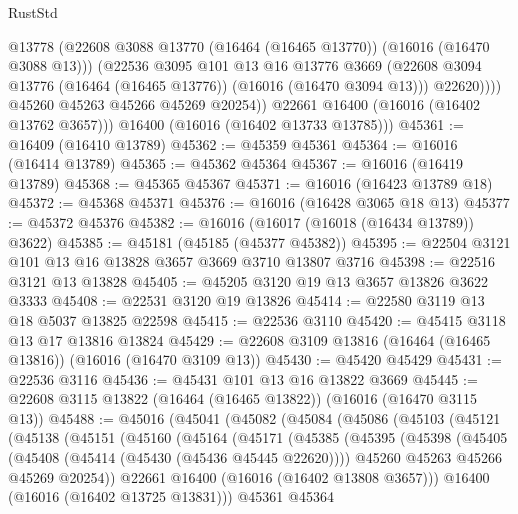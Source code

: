 \begin{lexlean}{RustStd}
\begin{coremodule}
                  @13778
                  (@22608 @3088 @13770 (@16464 (@16465 @13770)) (@16016 (@16470 @3088 @13)))
                  (@22536
                    @3095
                    @101
                    @13
                    @16
                    @13776
                    @3669
                    (@22608 @3094 @13776 (@16464 (@16465 @13776)) (@16016 (@16470 @3094 @13)))
                    @22620))))
            @45260
            @45263
            @45266
            @45269
            @20254))
        @22661
        @16400
        (@16016 (@16402 @13762 @3657)))
      @16400
      (@16016 (@16402 @13733 @13785)))
@45361 := @16409 (@16410 @13789)
@45362 := @45359 @45361
@45364 := @16016 (@16414 @13789)
@45365 := @45362 @45364
@45367 := @16016 (@16419 @13789)
@45368 := @45365 @45367
@45371 := @16016 (@16423 @13789 @18)
@45372 := @45368 @45371
@45376 := @16016 (@16428 @3065 @18 @13)
@45377 := @45372 @45376
@45382 := @16016 (@16017 (@16018 (@16434 @13789)) @3622)
@45385 := @45181 (@45185 (@45377 @45382))
@45395 := @22504 @3121 @101 @13 @16 @13828 @3657 @3669 @3710 @13807 @3716
@45398 := @22516 @3121 @13 @13828
@45405 := @45205 @3120 @19 @13 @3657 @13826 @3622 @3333
@45408 := @22531 @3120 @19 @13826
@45414 := @22580 @3119 @13 @18 @5037 @13825 @22598
@45415 := @22536 @3110
@45420 := @45415 @3118 @13 @17 @13816 @13824
@45429 := @22608 @3109 @13816 (@16464 (@16465 @13816)) (@16016 (@16470 @3109 @13))
@45430 := @45420 @45429
@45431 := @22536 @3116
@45436 := @45431 @101 @13 @16 @13822 @3669
@45445 := @22608 @3115 @13822 (@16464 (@16465 @13822)) (@16016 (@16470 @3115 @13))
@45488 := @45016
    (@45041
      (@45082
        (@45084
          (@45086
            (@45103
              (@45121
                (@45138
                  (@45151
                    (@45160
                      (@45164
                        (@45171
                          (@45385
                            (@45395
                              (@45398
                                (@45405
                                  (@45408 (@45414 (@45430 (@45436 @45445 @22620))))
                                  @45260
                                  @45263
                                  @45266
                                  @45269
                                  @20254))
                              @22661
                              @16400
                              (@16016 (@16402 @13808 @3657)))
                            @16400
                            (@16016 (@16402 @13725 @13831)))
                          @45361
                          @45364

\end{coremodule}
\end{lexlean}
